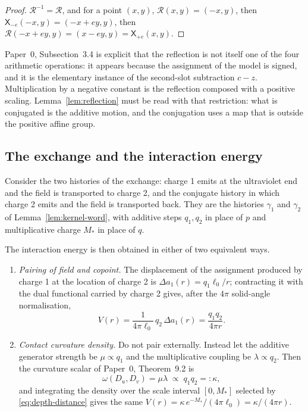 \begin{proof}
$\mathcal R^{-1}=\mathcal R$, and for a point $(x,y)$,
$\mathcal R(x,y)=(-x,y)$, then
$\mathsf X_{-e}(-x,y)=(-x+ey,y)$, then $\mathcal R(-x+ey,y)=(x-ey,y)
=\mathsf X_{+e}(x,y)$.
\end{proof}

\begin{warning}
\label{warn:reflection}
Paper~0, Subsection~3.4 is explicit that the reflection is not itself one of the
four arithmetic operations: it appears because the assignment of the model is
signed, and it is the elementary instance of the second-slot subtraction $c-z$.
Multiplication by a negative constant is the reflection composed with a positive
scaling.  Lemma~\ref{lem:reflection} must be read with that restriction: what is
conjugated is the additive motion, and the conjugation uses a map that is
outside the positive affine group.
\end{warning}

\subsection{The exchange and the interaction energy}

Consider the two histories of the exchange: charge 1 emits at the ultraviolet
end and the field is transported to charge 2, and the conjugate history in which
charge 2 emits and the field is transported back.  They are the histories
$\gamma_1$ and $\gamma_2$ of Lemma~\ref{lem:kernel-word}, with additive steps
$q_1,q_2$ in place of $p$ and multiplicative charge $M_*$ in place of $q$.

The interaction energy is then obtained in either of two equivalent ways.

\begin{enumerate}[label=(\alph*)]
  \item \emph{Pairing of field and copoint.}  The displacement of the assignment
  produced by charge 1 at the location of charge 2 is
  $\Delta a_1(r)=q_1\ell_0/r$; contracting it with the dual functional carried by
  charge 2 gives, after the $4\pi$ solid-angle normalisation,
  \begin{equation}\label{eq:pairing-energy}
    V(r)=\frac{1}{4\pi\ell_0}\,q_2\,\Delta a_1(r)
       =\frac{q_1q_2}{4\pi r} .
  \end{equation}
  \item \emph{Contact curvature density.}  Do not pair externally.  Instead let
  the additive generator strength be $\mu\propto q_1$ and the multiplicative
  coupling be $\lambda\propto q_2$.  Then the curvature scalar of Paper~0,
  Theorem~9.2 is
  \begin{equation}\label{eq:kappa}
    \omega(D_u,D_v)=\mu\lambda\;\propto\;q_1q_2=:\kappa ,
  \end{equation}
  and integrating the density over the scale interval $[0,M_*]$ selected by
  \eqref{eq:depth-distance} gives the same
  $V(r)=\kappa\,e^{-M_*}/(4\pi\ell_0)=\kappa/(4\pi r)$.
\end{enumerate}

